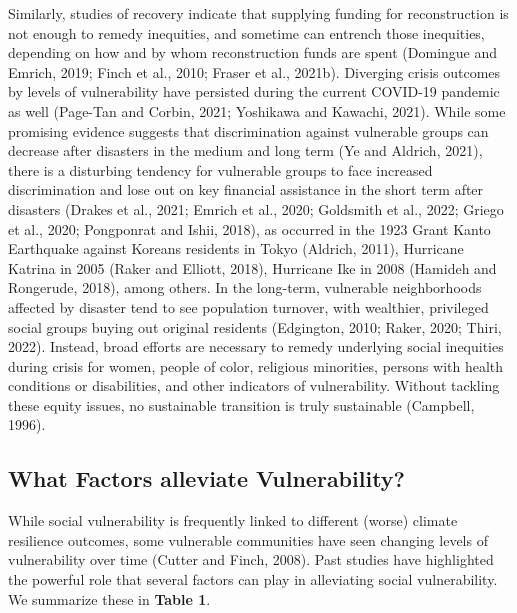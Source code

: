 \documentclass[]{elsarticle} %
\begin{document}
Similarly, studies of recovery indicate that supplying funding for
reconstruction is not enough to remedy inequities, and sometime can
entrench those inequities, depending on how and by whom reconstruction
funds are spent (Domingue and Emrich, 2019; Finch et al., 2010; Fraser
et al., 2021b). Diverging crisis outcomes by levels of vulnerability
have persisted during the current COVID-19 pandemic as well (Page-Tan
and Corbin, 2021; Yoshikawa and Kawachi, 2021). While some promising
evidence suggests that discrimination against vulnerable groups can
decrease after disasters in the medium and long term (Ye and Aldrich,
2021), there is a disturbing tendency for vulnerable groups to face
increased discrimination and lose out on key financial assistance in the
short term after disasters (Drakes et al., 2021; Emrich et al., 2020;
Goldsmith et al., 2022; Griego et al., 2020; Pongponrat and Ishii,
2018), as occurred in the 1923 Grant Kanto Earthquake against Koreans
residents in Tokyo (Aldrich, 2011), Hurricane Katrina in 2005 (Raker and
Elliott, 2018), Hurricane Ike in 2008 (Hamideh and Rongerude, 2018),
among others. In the long-term, vulnerable neighborhoods affected by
disaster tend to see population turnover, with wealthier, privileged
social groups buying out original residents (Edgington, 2010; Raker,
2020; Thiri, 2022). Instead, broad efforts are necessary to remedy
underlying social inequities during crisis for women, people of color,
religious minorities, persons with health conditions or disabilities,
and other indicators of vulnerability. Without tackling these equity
issues, no sustainable transition is truly sustainable (Campbell, 1996).

\hypertarget{what-factors-alleviate-vulnerability}{%
\subsection{What Factors alleviate
Vulnerability?}\label{what-factors-alleviate-vulnerability}}

While social vulnerability is frequently linked to different (worse)
climate resilience outcomes, some vulnerable communities have seen
changing levels of vulnerability over time (Cutter and Finch, 2008).
Past studies have highlighted the powerful role that several factors can
play in alleviating social vulnerability. We summarize these in
\textbf{Table 1}.
\end{document}
